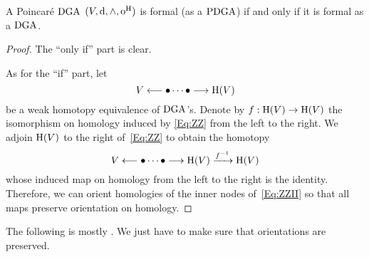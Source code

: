 \documentclass[\MainFolder/Text.tex]{subfiles}
\begin{document}
\begin{Proposition}\label{Prop:PoincModelOfFormal}
A Poincar\'e $\mathrm{DGA}$ $(V,\mathrm{d},\wedge,\mathrm{o}^{\mathrm{H}})$ is formal (as a $\mathrm{PDGA}$) if and only if it is formal as a $\mathrm{DGA}$.
\end{Proposition}
\begin{proof}
The ``only if'' part is clear.

As for the ``if'' part, let 
\begin{equation}\label{Eq:ZZ}
V \longleftarrow \bullet \dotsb \bullet \longrightarrow \mathrm{H}(V)
\end{equation}
be a weak homotopy equivalence of $\mathrm{DGA}$'s. Denote by $f: \mathrm{H}(V) \rightarrow \mathrm{H}(V)$ the isomorphism on homology induced by \eqref{Eq:ZZ} from the left to the right. We adjoin $\mathrm{H}(V)$ to the right of~\eqref{Eq:ZZ} to obtain the homotopy
\begin{equation}\label{Eq:ZZII}
V \longleftarrow \bullet \dotsb \bullet \longrightarrow \mathrm{H}(V) \xrightarrow{f^{-1}} \mathrm{H}(V)
\end{equation}
whose induced map on homology from the left to the right is the identity. Therefore, we can orient homologies of the inner nodes of~\eqref{Eq:ZZII} so that all maps preserve orientation on homology.
\end{proof}

The following is mostly \cite[Theorem~1.1]{Lambrechts2007}. We just have to make sure that orientations are preserved.
\end{document}
